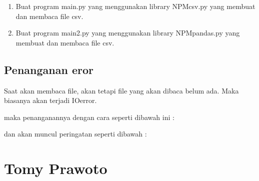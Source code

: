 \begin{enumerate}
	
	
	\item Buat program main.py yang menggunakan library NPMcsv.py yang membuat dan membaca file csv.
	
	
	
	\item Buat program main2.py yang menggunakan library NPMpandas.py yang membuat dan membaca file csv.
	
		
\end{enumerate}

\subsection{Penanganan eror}
Saat akan membaca file, akan tetapi file yang akan dibaca belum ada. Maka biasanya akan terjadi IOerror.

maka penanganannya dengan cara seperti dibawah ini :

dan akan muncul peringatan seperti dibawah :


\section{Tomy Prawoto}
